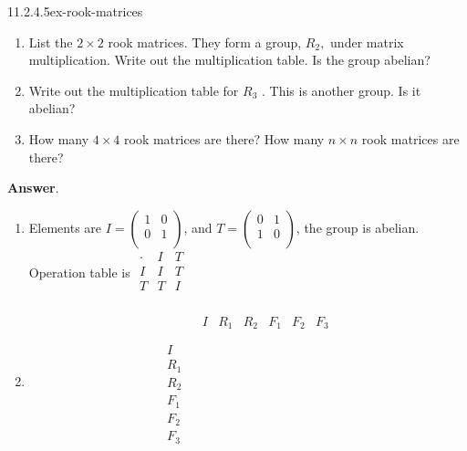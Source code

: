 \documentclass[twoside,10pt,]{book}
\numberwithin{equation}{section}
\begin{document}
\begin{divisionsolution}{11.2.4.5}{}{ex-rook-matrices}
\begin{enumerate}[label=(\alph*)]
\item\hypertarget{li-1766}{}\hypertarget{p-3865}{}%
List the \(2\times 2\) rook matrices. They form a group, \(R_2,\) under matrix multiplication. Write out the multiplication table. Is the group abelian?%
\item\hypertarget{li-1767}{}\hypertarget{p-3866}{}%
Write out the multiplication table for \(R_3\) . This is another group. Is it abelian?%
\item\hypertarget{li-1768}{}\hypertarget{p-3867}{}%
How many \(4\times 4\) rook matrices are there? How many \(n\times  n\) rook matrices are there?%
\end{enumerate}
%
\par\smallskip%
\noindent\textbf{Answer}.\quad%
\hypertarget{p-3868}{}%
\leavevmode%
\begin{enumerate}[label=(\alph*)]
\item\hypertarget{li-1769}{}\hypertarget{p-3869}{}%
Elements are \(I=\left(
\begin{array}{cc}
1 & 0 \\
0 & 1 \\
\end{array}
\right)\), and  \(T=\left(
\begin{array}{cc}
0 & 1 \\
1 & 0 \\
\end{array}
\right)\), the group is abelian.  Operation table is \(\begin{array}{c|cc}
\cdot & I  & T\\
\hline
I & I & T\\
T & T & I\\
\end{array}\)%
\item\hypertarget{li-1770}{}\hypertarget{p-3870}{}%
%
\begin{equation*}
\begin{array}{c|c}
& 
\begin{array}{cccccc}
I & R_1 & R_2 & F_1 & F_2 & F_3 \\
\end{array}
\\
\hline
\begin{array}{c}
I \\
R_1 \\
R_2 \\
F_1 \\
F_2 \\
F_3 \\

\end{array}
\end{array}
\end{equation*}
\end{enumerate}
\end{divisionsolution}
\end{document}
